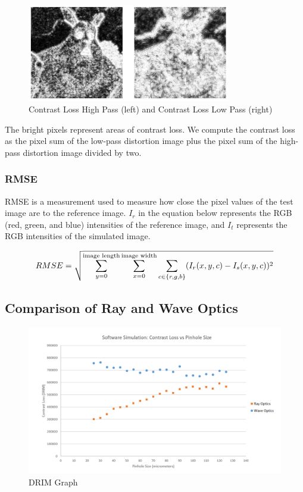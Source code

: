 \begin{figure}[ht]
  \centering
  \includegraphics[width=3.5in]{chapters/chapter8/images/hp_lp_contrast_loss.png}
  \caption{Contrast Loss High Pass (left) and Contrast Loss Low Pass (right)}
  \label{fig:ferrari}
\end{figure}

The bright pixels represent areas of contrast loss. We compute the contrast loss as the pixel sum of the low-pass distortion image plus the pixel sum of the high-pass distortion image divided by two. 

\subsubsection{RMSE}

RMSE is a measurement used to measure how close the pixel values of the test image are to the reference image. $I_r$ in the equation below represents the RGB (red, green, and blue) intensities of the reference image, and $I_t$ represents the RGB intensities of the simulated image.

$$RMSE = \sqrt{ \sum_{y = 0}^{\textnormal{image length}} \sum_{x = 0}^{\textnormal{image width}} \sum_{c \in \{r,g,b\}} (I_r (x,y,c) - I_s(x,y,c))^2}$$

\subsection{Comparison of Ray and Wave Optics}

\begin{figure}[ht]
  \centering
  \includegraphics[width=7.0in]{chapters/chapter8/images/Contrast_Loss.png}
  \caption{DRIM Graph}
  \label{fig:ferrari}
\end{figure}

